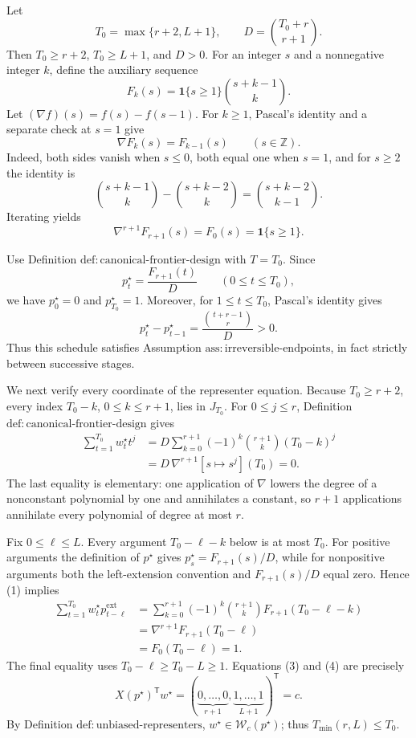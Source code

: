 Let
\[
 T_0=\max\{r+2,L+1\},\qquad D=\binom{T_0+r}{r+1}.
\]
Then \(T_0\ge r+2\), \(T_0\ge L+1\), and \(D>0\).  For an integer \(s\) and a nonnegative integer \(k\), define the auxiliary sequence
\[
 F_k(s)=\mathbf 1\{s\ge1\}\binom{s+k-1}{k}.
\]
Let \((\nabla f)(s)=f(s)-f(s-1)\).  For \(k\ge1\), Pascal's identity and a separate check at \(s=1\) give
\[
 \nabla F_k(s)=F_{k-1}(s)\qquad(s\in\mathbb Z).
\]
Indeed, both sides vanish when \(s\le0\), both equal one when \(s=1\), and for \(s\ge2\) the identity is
\[
 \binom{s+k-1}{k}-\binom{s+k-2}{k}
 =\binom{s+k-2}{k-1}.
\]
Iterating yields
\[
 \nabla^{r+1}F_{r+1}(s)=F_0(s)=\mathbf 1\{s\ge1\}.
 \tag{1}
\]

Use Definition \(\mathrm{def:canonical\text{-}frontier\text{-}design}\) with \(T=T_0\).  Since
\[
 p_t^\star=\frac{F_{r+1}(t)}{D}\qquad(0\le t\le T_0),
\]
we have \(p_0^\star=0\) and \(p_{T_0}^\star=1\).  Moreover, for \(1\le t\le T_0\), Pascal's identity gives
\[
 p_t^\star-p_{t-1}^\star
 =\frac{\binom{t+r-1}{r}}{D}>0.
 \tag{2}
\]
Thus this schedule satisfies Assumption \(\mathrm{ass:irreversible\text{-}endpoints}\), in fact strictly between successive stages.

We next verify every coordinate of the representer equation.  Because \(T_0\ge r+2\), every index \(T_0-k\), \(0\le k\le r+1\), lies in \(J_{T_0}\).  For \(0\le j\le r\), Definition \(\mathrm{def:canonical\text{-}frontier\text{-}design}\) gives
\[
\begin{aligned}
 \sum_{t=1}^{T_0}w_t^\star t^j
 &=D\sum_{k=0}^{r+1}(-1)^k\binom{r+1}{k}(T_0-k)^j\\
 &=D\,\nabla^{r+1}[s\mapsto s^j](T_0)=0.
\end{aligned}
\tag{3}
\]
The last equality is elementary: one application of \(\nabla\) lowers the degree of a nonconstant polynomial by one and annihilates a constant, so \(r+1\) applications annihilate every polynomial of degree at most \(r\).

Fix \(0\le\ell\le L\).  Every argument \(T_0-\ell-k\) below is at most \(T_0\).  For positive arguments the definition of \(p^\star\) gives \(p_s^\star=F_{r+1}(s)/D\), while for nonpositive arguments both the left-extension convention and \(F_{r+1}(s)/D\) equal zero.  Hence (1) implies
\[
\begin{aligned}
 \sum_{t=1}^{T_0}w_t^\star p_{t-\ell}^{\mathrm{ext}}
 &=\sum_{k=0}^{r+1}(-1)^k\binom{r+1}{k}F_{r+1}(T_0-\ell-k)\\
 &=\nabla^{r+1}F_{r+1}(T_0-\ell)\\
 &=F_0(T_0-\ell)=1.
\end{aligned}
\tag{4}
\]
The final equality uses \(T_0-\ell\ge T_0-L\ge1\).  Equations (3) and (4) are precisely
\[
 X(p^\star)^{\mathsf T}w^\star
 =(\underbrace{0,\ldots,0}_{r+1},
   \underbrace{1,\ldots,1}_{L+1})^{\mathsf T}=c.
\]
By Definition \(\mathrm{def:unbiased\text{-}representers}\), \(w^\star\in\mathcal W_c(p^\star)\); thus \(T_{\min}(r,L)\le T_0\).

